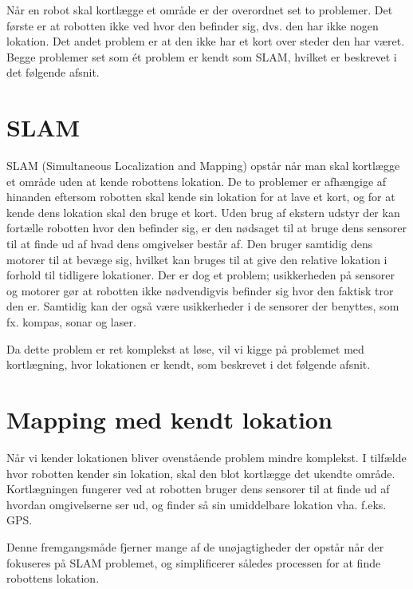Når en robot skal kortlægge et område er der overordnet set to problemer. 
Det første er at robotten ikke ved hvor den befinder sig, dvs. den har ikke nogen lokation.
Det andet problem er at den ikke har et kort over steder den har været.
Begge problemer set som ét problem er kendt som SLAM, hvilket er beskrevet i det følgende afsnit.

\section*{SLAM}\label{SLAM}
SLAM (Simultaneous Localization and Mapping) opstår når man skal kortlægge et område uden at kende robottens lokation.
De to problemer er afhængige af hinanden eftersom robotten skal kende sin lokation for at lave et kort, og for at kende dens lokation skal den bruge et kort.
Uden brug af ekstern udstyr der kan fortælle robotten hvor den befinder sig, er den nødsaget til at bruge dens sensorer til at finde ud af hvad dens omgivelser består af.
Den bruger samtidig dens motorer til at bevæge sig, hvilket kan bruges til at give den relative lokation i forhold til tidligere lokationer.
Der er dog et problem; usikkerheden på sensorer og motorer gør at robotten ikke nødvendigvis befinder sig hvor den faktisk tror den er.
Samtidig kan der også være usikkerheder i de sensorer der benyttes, som fx. kompas, sonar og laser.

Da dette problem er ret komplekst at løse, vil vi kigge på problemet med kortlægning, hvor lokationen er kendt, som beskrevet i det følgende afsnit.

\section*{Mapping med kendt lokation}\label{map_lok}
Når vi kender lokationen bliver ovenstående problem mindre komplekst.
I tilfælde hvor robotten kender sin lokation, skal den blot kortlægge det ukendte område.
Kortlægningen fungerer ved at robotten bruger dens sensorer til at finde ud af hvordan omgivelserne ser ud, og finder så sin umiddelbare lokation vha. f.eks. GPS.

Denne fremgangsmåde fjerner mange af de unøjagtigheder der opstår når der fokuseres på SLAM problemet, og simplificerer således processen for at finde robottens lokation.